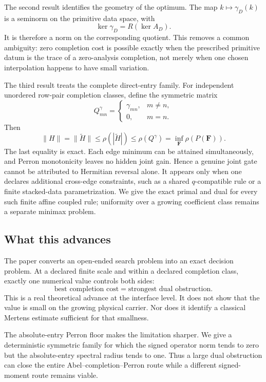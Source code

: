 The second result identifies the geometry of the optimum.  The map
\(k\mapsto\gamma_D(k)\) is a seminorm on the primitive data space, with
\[
 \ker\gamma_D=R(\ker A_D).
\]
It is therefore a norm on the corresponding quotient.  This removes a
common ambiguity: zero completion cost is possible exactly when the
prescribed primitive datum is the trace of a zero-analysis completion,
not merely when one chosen interpolation happens to have small
variation.

The third result treats the complete direct-entry family.  For
independent unordered row-pair completion classes, define the symmetric
matrix
\[
 Q^\gamma_{mn}
 =
 \begin{cases}
  \gamma_{mn},&m\ne n,\\
  0,&m=n.
 \end{cases}
\]
Then
\[
 \|H\|=\|\widetilde H\|
 \le \rho(|\widetilde H|)
 \le \rho(Q^\gamma)
 =
 \inf_{\boldsymbol F}\rho(P(\boldsymbol F)).
\]
The last equality is exact.  Each edge minimum can be attained
simultaneously, and Perron monotonicity leaves no hidden joint gain.
Hence a genuine joint gate cannot be attributed to Hermitian reversal
alone.  It appears only when one declares additional cross-edge
constraints, such as a shared \(q\)-compatible rule or a
finite stacked-data parametrization.  We give the exact primal and dual
for every such finite affine coupled rule; uniformity over a growing
coefficient class remains a separate minimax problem.

\subsection{What this advances}

The paper converts an open-ended search problem into an exact decision
problem.  At a declared finite scale and within a declared completion
class, exactly one numerical value controls both sides:
\[
 \text{best completion cost}
 =
 \text{strongest dual obstruction}.
\]
This is a real theoretical advance at the interface level.  It does not
show that the value is small on the growing physical carrier.  Nor does
it identify a classical Mertens estimate sufficient for that smallness.

The absolute-entry Perron floor makes the limitation sharper.  We give a
deterministic symmetric family for which the signed operator norm tends
to zero but the absolute-entry spectral radius tends to one.  Thus a
large dual obstruction can close the entire Abel--completion--Perron
route while a different signed-moment route remains viable.

